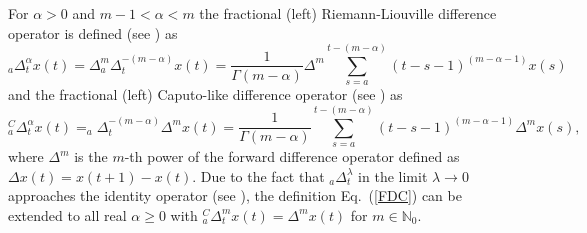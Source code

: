 \documentclass[graybox]{svmult}
\begin{document}
For $\alpha >0$ and   $m-1<\alpha < m$ the fractional (left) Riemann-Liouville difference operator is defined (see \cite{Atici1,Atici2}) as
\begin{equation} 
_a\Delta^{\alpha}_t x(t) =  \Delta^{m} _a\Delta^{-(m-\alpha)}_{t}x(t)
=\frac{1}{\Gamma(m-\alpha)} \Delta^m \sum^{t-(m-\alpha)}_{s=a}(t-s-1)^{(m-\alpha-1)} 
x(s)
\label{FDRL}
\end{equation}
and the fractional (left) Caputo-like difference operator (see \cite{Anastas}) as
\begin{equation} 
_a^C\Delta^{\alpha}_t x(t) =  _a\Delta^{-(m-\alpha)}_{t}\Delta^{m} x(t)
=\frac{1}{\Gamma(m-\alpha)} \sum^{t-(m-\alpha)}_{s=a}(t-s-1)^{(m-\alpha-1)} 
\Delta^m x(s),
\label{FDC}
\end{equation}
where $\Delta^{m}$ is the $m$-th power of the forward difference operator
defined as $\Delta x(t)=x(t+1)-x(t)$. 
Due to the fact that $_a\Delta^{\lambda}_t$ in the limit 
$\lambda \rightarrow 0$ approaches the identity operator (see \cite{ME9,MR}), the 
definition Eq.~(\ref{FDC}) can be extended to all real $\alpha \ge 0$
with $_a^C\Delta^{m}_t x(t) = \Delta^m x(t)$ for $m \in \mathbb{N}_0$.
\end{document}
